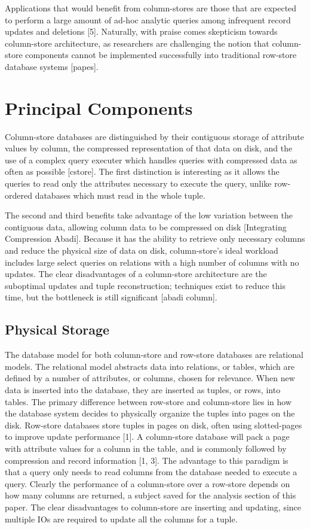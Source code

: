 \documentclass[11pt]{article}
\begin{document}
Applications that would benefit from column-stores are those that are expected to perform a large amount of ad-hoc analytic queries among infrequent record updates and deletions [5]. Naturally, with praise comes skepticism towards column-store architecture, as researchers are challenging the notion that column-store components cannot be implemented successfully into traditional row-store database systems [papes]. 

\section{Principal Components}
Column-store databases are distinguished by their contiguous storage of attribute values by column, the compressed representation of that data on disk, and the use of a complex query executer which handles queries with compressed data as often as possible [cstore]. The first distinction is interesting as it allows the queries to read only the attributes necessary to execute the query, unlike row-ordered databases which must read in the whole tuple. 

The second and third benefits take advantage of the low variation between the contiguous data, allowing column data to be compressed on disk [Integrating Compression Abadi]. Because it has the ability to retrieve only necessary columns and reduce the physical size of data on disk, column-store's ideal workload includes large select queries on relations with a high number of columns with no updates. The clear disadvantages of a column-store architecture are the suboptimal updates and tuple reconstruction; techniques exist to reduce this time, but the bottleneck is still significant [abadi column]. 

\subsection{Physical Storage}
The database model for both column-store and row-store databases are relational models. The relational model abstracts data into relations, or tables, which are defined by a number of attributes, or columns, chosen for relevance. When new data is inserted into the database, they are inserted as tuples, or rows, into tables. The primary difference between row-store and column-store lies in how the database system decides to physically organize the tuples into pages on the disk. Row-store databases store tuples in pages on disk, often using slotted-pages to improve update performance [1]. A column-store database will pack a  page with attribute values for a column in the table, and is commonly followed by compression and record information [1, 3].
The advantage to this paradigm is that a query only needs to read columns from the database needed to execute a query. Clearly the performance of a column-store over a row-store depends on how many columns are returned, a subject saved for the analysis section of this paper. The clear disadvantages to column-store are inserting and updating, since multiple IOs are required to update all the columns for a tuple. 
\end{document}
